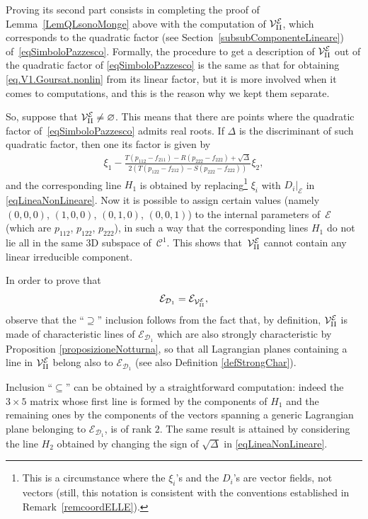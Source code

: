 \documentclass[10pt,a4paper]{amsart}
\newcommand{\C}{\mathcal{C}}
\newcommand{\D}{\mathcal{D}}
\newcommand{\MMM}{\mathcal{V}_{\textrm{\normalfont II}}}
\newcommand{\E}{\mathcal{E}}
\newcommand{\elle}{H}
\numberwithin{equation}{section}
\begin{document}
Proving its second part consists in completing the proof of Lemma~\ref{LemQLsonoMonge} above with the computation of $\MMM^\E$, which corresponds to the quadratic factor (see Section~\ref{subsubComponenteLineare}) of~\eqref{eqSimboloPazzesco}. Formally, the procedure to get a description of $\MMM^\E$ out of the quadratic factor of \eqref{eqSimboloPazzesco} is the same as that for obtaining \eqref{eq.V1.Goursat.nonlin} from its linear factor, but it is more involved when it comes to computations, and this is the reason why we kept them separate.

So, suppose that $\MMM^\E\neq\varnothing$. This means that there are points where the quadratic factor of~\eqref{eqSimboloPazzesco} admits real roots.
If $\Delta$ is the discriminant of such quadratic factor, then one its factor is given by
\begin{gather}\label{eqLineaNonLineare}
\xi_1-\frac{T(p_{112}-f_{211})-R(p_{222}-f_{222})+\sqrt{\Delta}}{2(T(p_{122}-f_{212})-S(p_{222}-f_{222}))}\xi_2,
\end{gather}
and the corresponding line $\elle_1$ is obtained by replacing\footnote{This is a circumstance where the $\xi_i$'s and the $D_i$'s are vector f\/ields, not vectors (still, this notation is consistent with the conventions established in Remark~\ref{remcoordELLE}).} $\xi_i$ with $D_i|_\E$ in \eqref{eqLineaNonLineare}.
Now it is possible to assign certain values (namely $(0,0,0)$, $(1,0,0)$, $(0,1,0)$, $(0,0,1)$) to the internal parameters of~$\E$ (which are $p_{112}$, $p_{122}$, $p_{222}$), in such a way that the corresponding lines $\elle_1$ do not lie all in the same 3D subspace of~$\C^1$.
This shows that~$\MMM^\E$ cannot contain any linear irreducible component.

In order to prove that
\begin{gather*}
\E_{\D_1}=\E_{\MMM^\E},
\end{gather*}
observe that the ``$\supseteq$'' inclusion follows from the fact that, by def\/inition, $\MMM^\E$ is made of characte\-ris\-tic lines of $\E_{\D_1}$ which are also strongly characteristic by Proposition \ref{proposizioneNotturna}, so that all Lagrangian planes containing a line in $\MMM^\E$ belong also to $\E_{\D_1}$ (see also Def\/inition \ref{defStrongChar}).

Inclusion ``$\subseteq$'' can be obtained by a straightforward computation: indeed the $3\times 5$ matrix whose f\/irst line is formed by the components of $\elle_1$ and the remaining ones by the components of the vectors spanning a generic Lagrangian plane belonging to $\E_{\D_1}$, is of rank $2$. The same result is attained by considering the line $\elle_2$ obtained by changing the sign of $\sqrt{\Delta}$ in \eqref{eqLineaNonLineare}.
\end{document}
